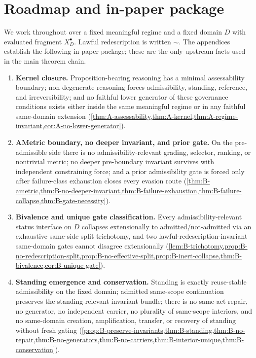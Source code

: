 \documentclass[11pt]{article}
\theoremstyle{plain}
\theoremstyle{definition}
\newcommand{\Law}{\sim}
\newcommand{\Eval}{X_D^{\bullet}}
\newcommand{\domain}{D}
\begin{document}
\section{Roadmap and in-paper package}
\label{sec:roadmap}

We work throughout over a fixed meaningful regime and a fixed domain $\domain$ with evaluated fragment $\Eval$. Lawful redescription is written $\Law$. The appendices establish the following in-paper package; these are the only upstream facts used in the main theorem chain.

\begin{enumerate}[label=\textbf{(P\arabic*)}, leftmargin=3.1em]
    \item \textbf{Kernel closure.} Proposition-bearing reasoning has a minimal assessability boundary; non-degenerate reasoning forces admissibility, standing, reference, and irreversibility; and no faithful lower generator of these governance conditions exists either inside the same meaningful regime or in any faithful same-domain extension (\cref{thm:A-assessability,thm:A-kernel,thm:A-regime-invariant,cor:A-no-lower-generator}).

    \item \textbf{AMetric boundary, no deeper invariant, and prior gate.} On the pre-admissible side there is no admissibility-relevant grading, selector, ranking, or nontrivial metric; no deeper pre-boundary invariant survives with independent constraining force; and a prior admissibility gate is forced only after failure-class exhaustion closes every evasion route (\cref{thm:B-ametric,thm:B-no-deeper-invariant,thm:B-failure-exhaustion,thm:B-failure-collapse,thm:B-gate-necessity}).

    \item \textbf{Bivalence and unique gate classification.} Every admissibility-relevant status interface on $\domain$ collapses extensionally to admitted/not-admitted via an exhaustive same-side split trichotomy, and two lawful-redescription-invariant same-domain gates cannot disagree extensionally (\cref{lem:B-trichotomy,prop:B-no-redescription-split,prop:B-no-effective-split,prop:B-inert-collapse,thm:B-bivalence,cor:B-unique-gate}).

    \item \textbf{Standing emergence and conservation.} Standing is exactly reuse-stable admissibility on the fixed domain; admitted same-scope continuation preserves the standing-relevant invariant bundle; there is no same-act repair, no generator, no independent carrier, no plurality of same-scope interiors, and no same-domain creation, amplification, transfer, or recovery of standing without fresh gating (\cref{prop:B-preserve-invariants,thm:B-standing,thm:B-no-repair,thm:B-no-generators,thm:B-no-carriers,thm:B-interior-unique,thm:B-conservation}).


\end{enumerate}
\end{document}
